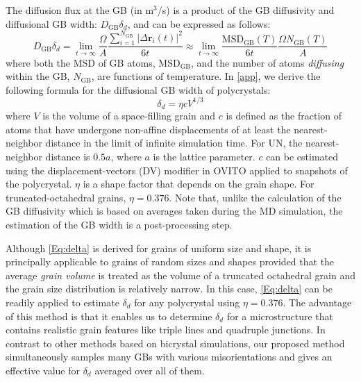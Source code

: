 \documentclass[preprint, 12pt]{elsarticle}
\newcommand{\?}{\stackrel{?}{=}}
\begin{document}
The diffusion flux at the GB (in m$^3$/s) is a product of the GB diffusivity and diffusional GB width: $D_{\mathrm{GB}} \delta_d$, and can be expressed as follows:
\begin{equation}
D_{\mathrm{GB}} \delta_d = \lim_{t \rightarrow \infty} \frac{\Omega}{A} \frac{\sum_{i=1}^{N_{\mathrm{GB}}} |\Delta \mathbf{r}_i(t)|^2}{6t} \approx \lim_{t \rightarrow \infty} \frac{\mathrm{MSD}_{\mathrm{GB}}(T)}{6t} \frac{\Omega N_{\mathrm{GB}}(T) }{A}
\label{Eq:GBDiffFlux}
\end{equation}
where both the MSD of GB atoms, MSD${_{\text{GB}}}$, and the number of atoms \textit{diffusing} within the GB, $N_{\mathrm{GB}}$, are functions of temperature. In \ref{app}, we derive the following formula for the diffusional GB width of polycrystals:
\begin{equation}
\delta_d = \eta c V^{1/3}
\label{Eq:delta}
\end{equation}
where $V$ is the volume of a space-filling grain and $c$ is defined as the fraction of atoms that have undergone non-affine displacements of at least the nearest-neighbor distance in the limit of infinite simulation time. For UN, the nearest-neighbor distance is $0.5a$, where $a$ is the lattice parameter. $c$ can be estimated using the displacement-vectors (DV) modifier in OVITO \cite{Stukowski2010} applied to snapshots of the polycrystal. $\eta$ is a shape factor that depends on the grain shape. For truncated-octahedral grains, $\eta = 0.376$. Note that, unlike the calculation of the GB diffusivity which is based on averages taken during the MD simulation, the estimation of the GB width is a post-processing step.

Although \cref{Eq:delta} is derived for grains of uniform size and shape, it is principally applicable to grains of random sizes and shapes provided that the average \textit{grain volume} is treated as the volume of a truncated octahedral grain and the grain size distribution is relatively narrow. In this case, \cref{Eq:delta} can be readily applied to estimate $\delta_d$ for any polycrystal using $\eta = 0.376$. The advantage of this method is that it enables us to determine $\delta_d$ for a microstructure that contains realistic grain features like triple lines and quadruple junctions. In contrast to other methods based on bicrystal simulations, our proposed method simultaneously samples many GBs with various misorientations and gives an effective value for $\delta_d$ averaged over all of them.
\end{document}
